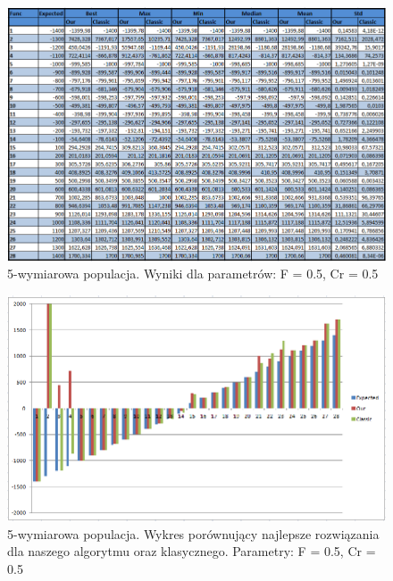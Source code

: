\documentclass[a4paper]{article}
\begin{document}
\begin{figure}[!h]
\centering
\includegraphics[width=\textwidth]{F5Cr5L5tab.png}
\caption{5-wymiarowa populacja. Wyniki dla parametrów: F = 0.5, Cr = 0.5}
\end{figure}

\begin{figure}[!h]
\centering
\includegraphics[width=\textwidth]{F5Cr5L5chart.png}
\caption{5-wymiarowa populacja. Wykres porównujący najlepsze rozwiązania dla naszego algorytmu oraz klasycznego. Parametry: F = 0.5, Cr = 0.5}
\end{figure}
\end{document}
